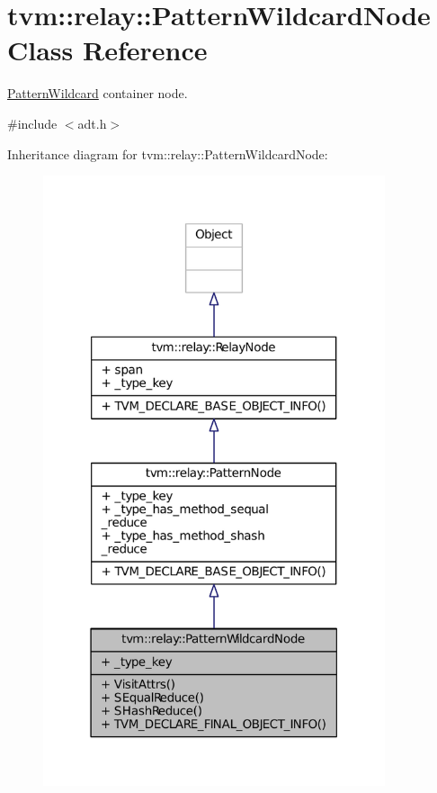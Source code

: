 \hypertarget{classtvm_1_1relay_1_1PatternWildcardNode}{}\section{tvm\+:\+:relay\+:\+:Pattern\+Wildcard\+Node Class Reference}
\label{classtvm_1_1relay_1_1PatternWildcardNode}


\hyperlink{classtvm_1_1relay_1_1PatternWildcard}{Pattern\+Wildcard} container node.  




{\ttfamily \#include $<$adt.\+h$>$}



Inheritance diagram for tvm\+:\+:relay\+:\+:Pattern\+Wildcard\+Node\+:
\nopagebreak
\begin{figure}[H]
\begin{center}
\leavevmode
\includegraphics[width=285pt]{classtvm_1_1relay_1_1PatternWildcardNode__inherit__graph}
\end{center}
\end{figure}


